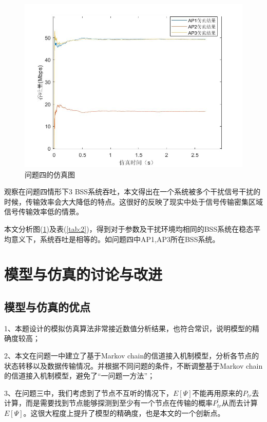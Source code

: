 \documentclass[bwprint]{gmcmthesis}
\begin{document}
\begin{figure}[H]
    \centering
    \includegraphics[width=.9\textwidth]{figures/q4.png}
    \caption{问题四的仿真图}
    \label{fig:q4}
\end{figure}

观察在问题四情形下3 BSS系统吞吐，本文得出在一个系统被多个干扰信号干扰的时候，传输效率会大大降低的特点。这很好的反映了现实中处于信号传输密集区域信号传输效率低的情景。

本文分析图(\ref{fig:q4})及表(\ref{tab:2})，得到对于参数及干扰环境均相同的BSS系统在稳态平均意义下，系统吞吐是相等的。如问题四中AP1,AP3所在BSS系统。


\section{模型与仿真的讨论与改进}

\subsection{模型与仿真的优点}

1、本题设计的模拟仿真算法非常接近数值分析结果，也符合常识，说明模型的精确度较高；

2、本文在问题一中建立了基于Markov chain的信道接入机制模型，分析各节点的状态转移以及数据传输情况。并根据不同问题的条件，不断调整基于Markov chain的信道接入机制模型，避免了“一问题一方法”；

3、在问题三中，我们考虑到了节点不互听的情况下，$E[\Psi ]$不能再用原来的$P_{tr}$去计算，而是需要找到节点能够探测到至少有一个节点在传输的概率$P_{tr}^{'}$从而去计算$E[\Psi ]$。这很大程度上提升了模型的精确度，也是本文的一个创新点。
\end{document}
